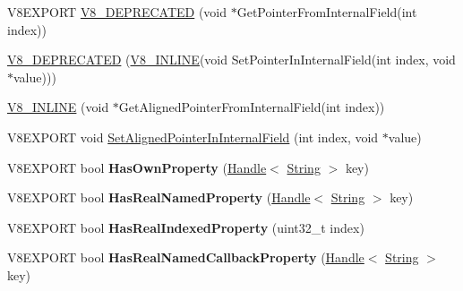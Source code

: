 \begin{DoxyCompactItemize}
\item 
V8\+E\+X\+P\+O\+R\+T \hyperlink{classv8_1_1_object_a604262e31d67aa75afedac925fe98d3c}{V8\+\_\+\+D\+E\+P\+R\+E\+C\+A\+T\+E\+D} (void $\ast$Get\+Pointer\+From\+Internal\+Field(int index))
\item 
\hyperlink{classv8_1_1_object_aa547dac4adb361fe6750fd586e974238}{V8\+\_\+\+D\+E\+P\+R\+E\+C\+A\+T\+E\+D} (\hyperlink{classv8_1_1_object_a478c557d3d547921436d1f8312deb831}{V8\+\_\+\+I\+N\+L\+I\+N\+E}(void Set\+Pointer\+In\+Internal\+Field(int index, void $\ast$value)))
\item 
\hyperlink{classv8_1_1_object_abb14a7d7817c7b988957b3ad495adcca}{V8\+\_\+\+I\+N\+L\+I\+N\+E} (void $\ast$Get\+Aligned\+Pointer\+From\+Internal\+Field(int index))
\item 
V8\+E\+X\+P\+O\+R\+T void \hyperlink{classv8_1_1_object_a87fc9dfdacdaaf65d72b3ad3c4e486c1}{Set\+Aligned\+Pointer\+In\+Internal\+Field} (int index, void $\ast$value)
\item 
\hypertarget{classv8_1_1_object_a58cf9219dca36c4b17f02544c59a2549}{}V8\+E\+X\+P\+O\+R\+T bool {\bfseries Has\+Own\+Property} (\hyperlink{classv8_1_1_handle}{Handle}$<$ \hyperlink{classv8_1_1_string}{String} $>$ key)\label{classv8_1_1_object_a58cf9219dca36c4b17f02544c59a2549}

\item 
\hypertarget{classv8_1_1_object_ad5f2524b42102c4feb63fe5e17eaec83}{}V8\+E\+X\+P\+O\+R\+T bool {\bfseries Has\+Real\+Named\+Property} (\hyperlink{classv8_1_1_handle}{Handle}$<$ \hyperlink{classv8_1_1_string}{String} $>$ key)\label{classv8_1_1_object_ad5f2524b42102c4feb63fe5e17eaec83}

\item 
\hypertarget{classv8_1_1_object_ae1835a3c20cb3bf485e575f4c82aa5af}{}V8\+E\+X\+P\+O\+R\+T bool {\bfseries Has\+Real\+Indexed\+Property} (uint32\+\_\+t index)\label{classv8_1_1_object_ae1835a3c20cb3bf485e575f4c82aa5af}

\item 
\hypertarget{classv8_1_1_object_a7d3dbdffefc92245e04b0828aa0e770d}{}V8\+E\+X\+P\+O\+R\+T bool {\bfseries Has\+Real\+Named\+Callback\+Property} (\hyperlink{classv8_1_1_handle}{Handle}$<$ \hyperlink{classv8_1_1_string}{String} $>$ key)\label{classv8_1_1_object_a7d3dbdffefc92245e04b0828aa0e770d}


\end{DoxyCompactItemize}
